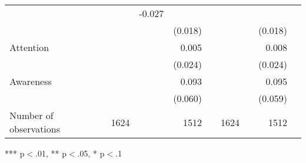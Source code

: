 \documentclass{article}
\begin{document}
\begin{table}[!h]
\begin{tabular}{lllllllll}
  \multicolumn{1}{r}{} &
  \multicolumn{1}{l}{} &
  \multicolumn{1}{r}{-0.027} &
  \multicolumn{1}{l}{} \\
\multicolumn{1}{l}{} &
  \multicolumn{1}{r}{} &
  \multicolumn{1}{l}{} &
  \multicolumn{1}{r}{(0.018)} &
  \multicolumn{1}{l}{} &
  \multicolumn{1}{r}{} &
  \multicolumn{1}{l}{} &
  \multicolumn{1}{r}{(0.018)} &
  \multicolumn{1}{l}{} \\
\multicolumn{1}{l}{Attention} &
  \multicolumn{1}{r}{} &
  \multicolumn{1}{l}{} &
  \multicolumn{1}{r}{0.005} &
  \multicolumn{1}{l}{} &
  \multicolumn{1}{r}{} &
  \multicolumn{1}{l}{} &
  \multicolumn{1}{r}{0.008} &
  \multicolumn{1}{l}{} \\
\multicolumn{1}{l}{} &
  \multicolumn{1}{r}{} &
  \multicolumn{1}{l}{} &
  \multicolumn{1}{r}{(0.024)} &
  \multicolumn{1}{l}{} &
  \multicolumn{1}{r}{} &
  \multicolumn{1}{l}{} &
  \multicolumn{1}{r}{(0.024)} &
  \multicolumn{1}{l}{} \\
\multicolumn{1}{l}{Awareness} &
  \multicolumn{1}{r}{} &
  \multicolumn{1}{l}{} &
  \multicolumn{1}{r}{0.093} &
  \multicolumn{1}{l}{} &
  \multicolumn{1}{r}{} &
  \multicolumn{1}{l}{} &
  \multicolumn{1}{r}{0.095} &
  \multicolumn{1}{l}{} \\
\multicolumn{1}{l}{} &
  \multicolumn{1}{r}{} &
  \multicolumn{1}{l}{} &
  \multicolumn{1}{r}{(0.060)} &
  \multicolumn{1}{l}{} &
  \multicolumn{1}{r}{} &
  \multicolumn{1}{l}{} &
  \multicolumn{1}{r}{(0.059)} &
  \multicolumn{1}{l}{} \\
\multicolumn{1}{l}{Number of observations} &
  \multicolumn{1}{r}{1624} &
  \multicolumn{1}{l}{} &
  \multicolumn{1}{r}{1512} &
  \multicolumn{1}{l}{} &
  \multicolumn{1}{r}{1624} &
  \multicolumn{1}{l}{} &
  \multicolumn{1}{r}{1512} &
  \multicolumn{1}{l}{} \\
\cline{1-9}
\end{tabular}

\footnotesize{
*** p$<$.01, ** p$<$.05, * p$<$.1
}
\end{table}
\end{document}
